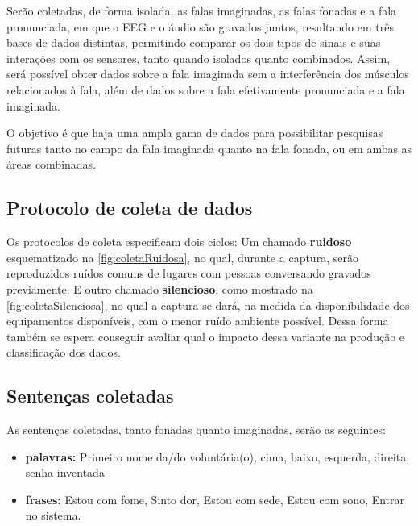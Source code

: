 		\par Serão coletadas, de forma isolada, as falas imaginadas, as falas fonadas e a fala pronunciada, em que o EEG e o áudio são gravados juntos, resultando em três bases de dados distintas, permitindo comparar os dois tipos de sinais e suas interações com os sensores, tanto quando isolados quanto combinados. Assim, será possível obter dados sobre a fala imaginada sem a interferência dos músculos relacionados à fala, além de dados sobre a fala efetivamente pronunciada e a fala imaginada.
		
		\par O objetivo é que haja uma ampla gama de dados para possibilitar pesquisas futuras tanto no campo da fala imaginada quanto na fala fonada, ou em ambas as áreas combinadas.
		
	    \subsection{Protocolo de coleta de dados}
		    
		    \par Os protocolos de coleta especificam dois ciclos: Um chamado \textbf{ruidoso} esquematizado na \autoref{fig:coletaRuidosa}, no qual, durante a captura, serão reproduzidos ruídos comuns de lugares com pessoas conversando gravados previamente. E outro chamado \textbf{silencioso}, como mostrado na \autoref{fig:coletaSilenciosa}, no qual a captura se dará, na medida da disponibilidade dos equipamentos disponíveis, com o menor ruído ambiente possível. Dessa forma também se espera conseguir avaliar qual o impacto dessa variante na produção e classificação dos dados.
		    
		    \subsection{Sentenças coletadas}
		    
			    \par As sentenças coletadas, tanto fonadas quanto imaginadas, serão as seguintes:
			    \begin{itemize}
			    	\item \textbf{palavras:} Primeiro nome da/do voluntária(o), cima, baixo, esquerda, direita, senha inventada
			    	\item \textbf{frases:} Estou com fome, Sinto dor, Estou com sede, Estou com sono, Entrar no sistema.
			    \end{itemize}
			    
